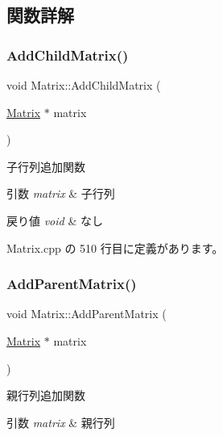 \subsection{関数詳解}
\mbox{\label{class_matrix_a85469d633691b3c3d8a3cfb260dd1d48}} 
\subsubsection{\texorpdfstring{Add\+Child\+Matrix()}{AddChildMatrix()}}
{\footnotesize\ttfamily void Matrix\+::\+Add\+Child\+Matrix (\begin{DoxyParamCaption}\item[{\mbox{\hyperlink{class_matrix}{Matrix}} $\ast$}]{matrix }\end{DoxyParamCaption})}



子行列追加関数 


\begin{DoxyParams}{引数}
{\em matrix} & 子行列 \\
\hline
\end{DoxyParams}

\begin{DoxyRetVals}{戻り値}
{\em void} & なし \\
\hline
\end{DoxyRetVals}


 Matrix.\+cpp の 510 行目に定義があります。

\mbox{\label{class_matrix_a9bfa12d6b05ca2748def870d24356946}} 
\subsubsection{\texorpdfstring{Add\+Parent\+Matrix()}{AddParentMatrix()}}
{\footnotesize\ttfamily void Matrix\+::\+Add\+Parent\+Matrix (\begin{DoxyParamCaption}\item[{\mbox{\hyperlink{class_matrix}{Matrix}} $\ast$}]{matrix }\end{DoxyParamCaption})}



親行列追加関数 


\begin{DoxyParams}{引数}
{\em matrix} & 親行列 \\
\hline
\end{DoxyParams}

